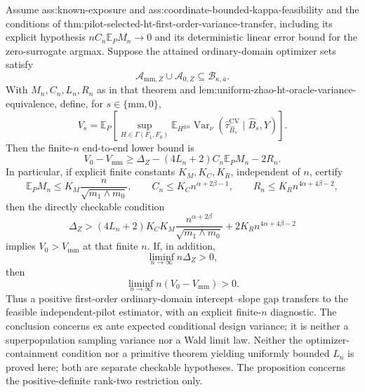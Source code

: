 Assume ass:known-exposure and ass:coordinate-bounded-kappa-feasibility and the conditions of thm:pilot-selected-ht-first-order-variance-transfer, including its explicit hypothesis \(nC_n\mathbb E_PM_n\to0\) and its deterministic linear error bound for the zero-surrogate argmax.  Suppose the attained ordinary-domain optimizer sets satisfy
\[
\mathcal A_{\mathrm{mm},Z}\cup\mathcal A_{0,Z}
\subseteq\mathcal B_{\kappa,\overline a}.
\]
With \(M_n,C_n,L_n,R_n\) as in that theorem and lem:uniform-zhao-ht-oracle-variance-equivalence, define, for \(s\in\{\mathrm{mm},0\}\),
\[
V_s=
\mathbb E_P\left[
\sup_{H\in\Gamma(F_1,F_0)}
\mathbb E_{H^{\otimes n}}
\operatorname{Var}_\nu
(\widehat\tau_{\widehat B_s}^{\mathrm{CV}}\mid\widehat B_s,Y)
\right].
\]
Then the finite-\(n\) end-to-end lower bound is
\[
V_0-V_{\mathrm{mm}}
\ge
\Delta_Z-(4L_n+2)C_n\mathbb E_PM_n-2R_n.
\]
In particular, if explicit finite constants \(K_M,K_C,K_R\), independent of \(n\), certify
\[
\mathbb E_PM_n\le K_M\frac{n}{\sqrt{m_1\wedge m_0}},
\qquad
C_n\le K_Cn^{\alpha+2\beta-1},
\qquad
R_n\le K_Rn^{4\alpha+4\beta-2},
\]
then the directly checkable condition
\[
\Delta_Z>
(4L_n+2)K_CK_M
\frac{n^{\alpha+2\beta}}{\sqrt{m_1\wedge m_0}}
+2K_Rn^{4\alpha+4\beta-2}
\]
implies \(V_0>V_{\mathrm{mm}}\) at that finite \(n\).  If, in addition,
\[
\liminf_{n\to\infty}n\Delta_Z>0,
\]
then
\[
\liminf_{n\to\infty}n(V_0-V_{\mathrm{mm}})>0.
\]
Thus a positive first-order ordinary-domain intercept--slope gap transfers to the feasible independent-pilot estimator, with an explicit finite-\(n\) diagnostic.  The conclusion concerns ex ante expected conditional design variance; it is neither a superpopulation sampling variance nor a Wald limit law.  Neither the optimizer-containment condition nor a primitive theorem yielding uniformly bounded \(L_n\) is proved here; both are separate checkable hypotheses.  The proposition concerns the positive-definite rank-two restriction only.
